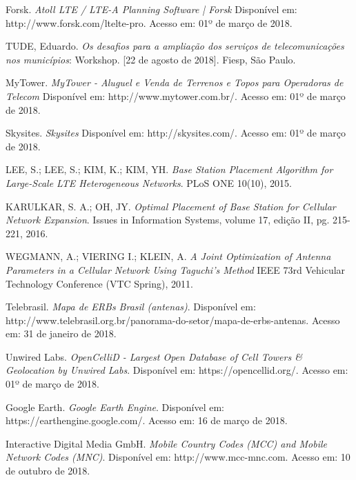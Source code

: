\documentclass[]{politex}
\begin{document}
\begin{thebibliography}{9}

    Forsk.
    \textit{Atoll LTE / LTE-A Planning Software | Forsk}
    Disponível em: http://www.forsk.com/ltelte-pro.
    Acesso em: 01º de março de 2018.

    TUDE, Eduardo.
    \textit{Os desafios para a ampliação dos serviços de telecomunicações nos
    municípios}: Workshop.
    [22 de agosto de 2018].
    Fiesp, São Paulo.

    MyTower.
    \textit{MyTower - Aluguel e Venda de Terrenos e Topos para
    Operadoras de Telecom}
    Disponível em: http://www.mytower.com.br/.
    Acesso em: 01º de março de 2018.

    Skysites.
    \textit{Skysites}
    Disponível em: http://skysites.com/.
    Acesso em: 01º de março de 2018.

    LEE, S.; LEE, S.; KIM, K.; KIM, YH.
    \textit{Base Station Placement Algorithm for Large-Scale LTE
    Heterogeneous Networks}.
    PLoS ONE 10(10), 2015.

    KARULKAR, S. A.; OH, JY.
    \textit{Optimal Placement of Base Station for Cellular Network Expansion}.
    Issues in Information Systems, volume 17, edição II, pg. 215-221, 2016.

    WEGMANN, A.; VIERING I.; KLEIN, A.
    \textit{A Joint Optimization of Antenna Parameters in a
    Cellular Network Using Taguchi’s Method}
    IEEE 73rd Vehicular Technology Conference (VTC Spring), 2011.

    Telebrasil.
    \textit{Mapa de ERBs Brasil (antenas)}.
    Disponível em:
    http://www.telebrasil.org.br/panorama-do-setor/mapa-de-erbs-antenas.
    Acesso em: 31 de janeiro de 2018.

    Unwired Labs.
    \textit{OpenCelliD - Largest Open Database of Cell Towers \&
    Geolocation by Unwired Labs}.
    Disponível em: https://opencellid.org/.
    Acesso em: 01º de março de 2018.

    Google Earth.
    \textit{Google Earth Engine}.
    Disponível em: https://earthengine.google.com/.
    Acesso em: 16 de março de 2018.

    Interactive Digital Media GmbH.
    \textit{Mobile Country Codes (MCC) and Mobile Network Codes (MNC)}.
    Disponível em: http://www.mcc-mnc.com.
    Acesso em: 10 de outubro de 2018.


\end{thebibliography}
\end{document}
